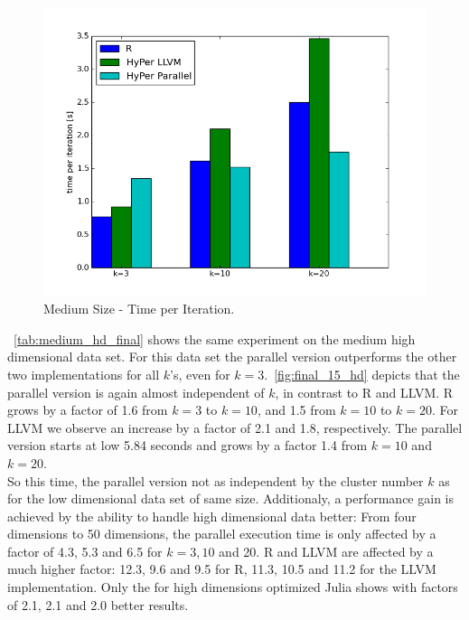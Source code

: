 \begin{figure}[htsb]
  \centering
  \includegraphics[scale=0.4, trim="0cm 1.5cm 0cm 0cm"]{figures/charts/final_15M}
  \caption[Medium Size - Time per Iteration]{Medium Size - Time per Iteration.}
  \label{fig:final_15M}
\end{figure}

~\autoref{tab:medium_hd_final} shows the same experiment on the medium high dimensional data set. For this data set the parallel version outperforms the other two implementations for all $k$'s, even for $k = 3$.~\autoref{fig:final_15_hd} depicts that the parallel version is again almost independent of $k$, in contrast to R and LLVM. R grows by a factor of 1.6 from $k = 3$ to $k = 10$, and 1.5 from $k = 10$ to $k = 20$. For LLVM we observe an increase by a factor of 2.1 and 1.8, respectively. The parallel version starts at low 5.84 seconds and grows by a factor 1.4 from $k = 10$ and $k = 20$. 
\\
So this time, the parallel version not as independent by the cluster number $k$ as for the low dimensional data set of same size. Additionaly, a performance gain is achieved by the ability to handle high dimensional data better: From four dimensions to 50 dimensions, the parallel execution time is only affected by a factor of 4.3, 5.3 and 6.5 for $k = 3, 10$ and 20. R and LLVM are affected by a much higher factor: 12.3, 9.6 and 9.5 for R, 11.3, 10.5 and 11.2 for the LLVM implementation. Only the for high dimensions optimized Julia shows with factors of 2.1, 2.1 and 2.0 better results.

